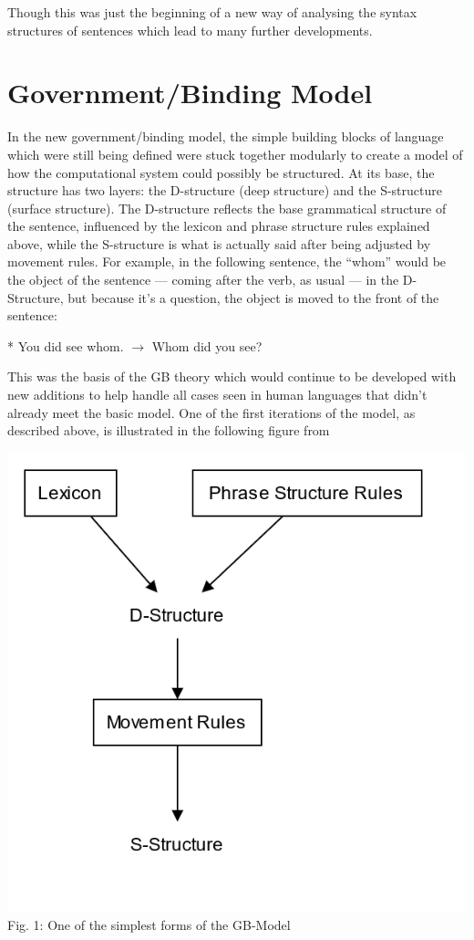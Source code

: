 \documentclass[a4paper,10pt]{article}
\begin{document}
Though this was just the beginning of a new way of analysing the syntax structures of sentences
which lead to many further developments.


\section{Government/Binding Model}
In the new government/binding model, the simple building blocks of language which were still being
defined were stuck together modularly to create a model of how the computational system could possibly be
structured. At its base, the structure has two layers: the D-structure (deep structure) and the
S-structure (surface structure). The D-structure reflects the base grammatical structure of the
sentence, influenced by the lexicon and phrase structure rules explained above, while the S-structure
is what is actually said after being adjusted by movement rules. \citep[p.~61]{ChUGAI}
For example, in the following sentence, the ``whom'' would be the object of the sentence --- coming
after the verb, as usual --- in the D-Structure, but because it's a question, the object is moved
to the front of the sentence:

\begin{center}
	* You did see whom. $\rightarrow$ Whom did you see?
\end{center}

This was the basis of the GB theory which would continue to be developed with new additions to
help handle all cases seen in human languages that didn't already meet the basic model. One of
the first iterations of the model, as described above, is illustrated in the following figure
from \citet[p.~62]{ChUGAI}

\begin{center}
	\includegraphics[scale=0.25]{gb-model-init.png}
	\linebreak
	Fig. 1: One of the simplest forms of the GB-Model
\end{center}
\end{document}
